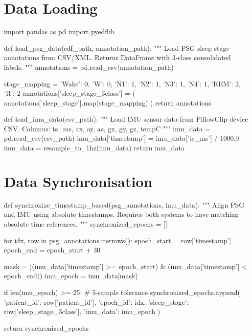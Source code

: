 \section{Data Loading}
\label{app:data_loading}

\begin{pycode}
import pandas as pd
import pyedflib

def load_psg_data(edf_path, annotation_path):
    """
    Load PSG sleep stage annotations from CSV/XML.
    Returns DataFrame with 3-class consolidated labels.
    """
    annotations = pd.read_csv(annotation_path)

    stage_mapping = {
        'Wake': 0, 'W': 0,
        'N1': 1, 'N2': 1, 'N3': 1, 'N4': 1,
        'REM': 2, 'R': 2
    }
    annotations['sleep_stage_3class'] = (
        annotations['sleep_stage'].map(stage_mapping)
    )
    return annotations
\end{pycode}

\begin{pycode}
def load_imu_data(csv_path):
    """
    Load IMU sensor data from PillowClip device CSV.
    Columns: ts_ms, ax, ay, az, gx, gy, gz, tempC
    """
    imu_data = pd.read_csv(csv_path)
    imu_data['timestamp'] = imu_data['ts_ms'] / 1000.0
    imu_data = resample_to_1hz(imu_data)
    return imu_data
\end{pycode}

\section{Data Synchronisation}
\label{app:synchronisation}

\begin{pycode}
def synchronize_timestamp_based(psg_annotations, imu_data):
    """
    Align PSG and IMU using absolute timestamps.
    Requires both systems to have matching absolute time references.
    """
    synchronized_epochs = []

    for idx, row in psg_annotations.iterrows():
        epoch_start = row['timestamp']
        epoch_end   = epoch_start + 30

        mask = ((imu_data['timestamp'] >= epoch_start) &
                (imu_data['timestamp'] <  epoch_end))
        imu_epoch = imu_data[mask]

        if len(imu_epoch) >= 25:   # 5-sample tolerance
            synchronized_epochs.append({
                'patient_id':  row['patient_id'],
                'epoch_id':    idx,
                'sleep_stage': row['sleep_stage_3class'],
                'imu_data':    imu_epoch
            })

    return synchronized_epochs
\end{pycode}

